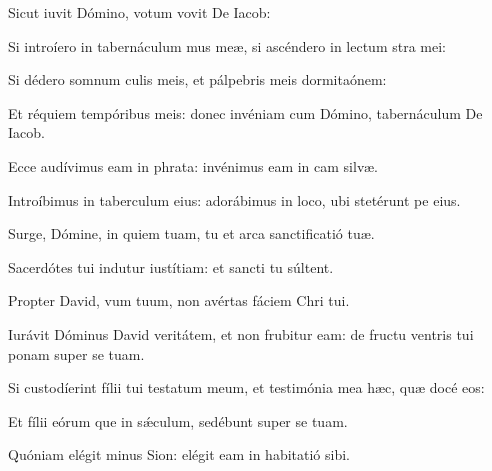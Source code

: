 \item {}

\item Sicut iuvit Dómino,\psstar{} votum vovit De Iacob:

\item Si introíero in tabernáculum mus meæ,\psstar{} si ascéndero in lectum stra mei:

\item Si dédero somnum culis meis,\psstar{} et pálpebris meis dormitaónem:

\item Et réquiem tempóribus meis: donec invéniam cum Dómino,\psstar{} tabernáculum De Iacob.

\item Ecce audívimus eam in phrata:\psstar{} invénimus eam in cam silvæ.

\item Introíbimus in taberculum eius:\psstar{} adorábimus in loco, ubi stetérunt pe eius.

\item Surge, Dómine, in quiem tuam,\psstar{} tu et arca sanctificatió tuæ.

\item Sacerdótes tui indutur iustítiam:\psstar{} et sancti tu súltent.

\item Propter David, vum tuum,\psstar{} non avértas fáciem Chri tui.

\item Iurávit Dóminus David veritátem, et non frubitur eam:\psstar{} de fructu ventris tui ponam super se tuam.

\item Si custodíerint fílii tui testatum meum,\psstar{} et testimónia mea hæc, quæ docé eos:

\item Et fílii eórum que in sǽculum,\psstar{} sedébunt super se tuam.

\item Quóniam elégit minus Sion:\psstar{} elégit eam in habitatió sibi.

